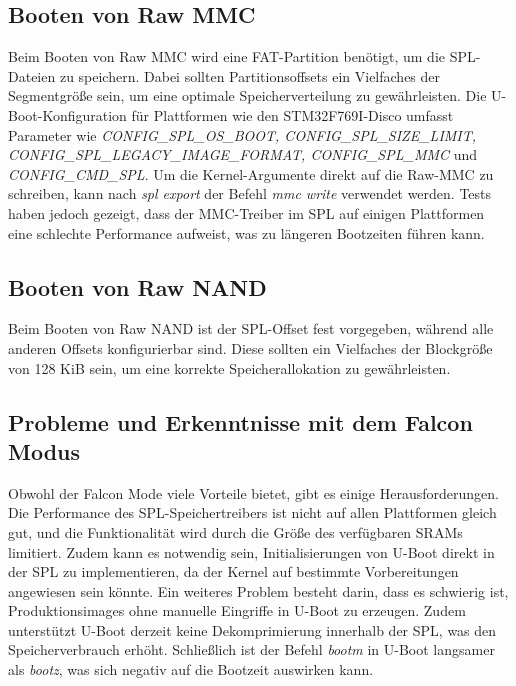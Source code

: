 \subsection{Booten von Raw MMC}
Beim Booten von Raw MMC wird eine FAT-Partition benötigt, um die SPL-Dateien zu speichern. Dabei sollten
Partitionsoffsets ein Vielfaches der Segmentgröße sein, um eine optimale Speicherverteilung zu gewährleisten.
Die U-Boot-Konfiguration für Plattformen wie den STM32F769I-Disco umfasst Parameter wie
\textit{CONFIG\_SPL\_OS\_BOOT, CONFIG\_SPL\_SIZE\_LIMIT, CONFIG\_SPL\_LEGACY\_IMAGE\_FORMAT, CONFIG\_SPL\_MMC}
und \textit{CONFIG\_CMD\_SPL}. Um die Kernel-Argumente direkt auf die Raw-MMC zu schreiben, kann nach
\textit{spl export} der Befehl \textit{mmc write} verwendet werden. Tests haben jedoch gezeigt, dass der
MMC-Treiber im SPL auf einigen Plattformen eine schlechte Performance aufweist, was zu längeren Bootzeiten
führen kann.

\subsection{Booten von Raw NAND}
Beim Booten von Raw NAND ist der SPL-Offset fest vorgegeben, während alle anderen Offsets konfigurierbar sind.
Diese sollten ein Vielfaches der Blockgröße von 128 KiB sein, um eine korrekte Speicherallokation zu
gewährleisten.

\subsection{Probleme und Erkenntnisse mit dem Falcon Modus}
Obwohl der Falcon Mode viele Vorteile bietet, gibt es einige Herausforderungen. Die Performance des
SPL-Speichertreibers ist nicht auf allen Plattformen gleich gut, und die Funktionalität wird durch die Größe
des verfügbaren SRAMs limitiert. Zudem kann es notwendig sein, Initialisierungen von U-Boot direkt in der SPL
zu implementieren, da der Kernel auf bestimmte Vorbereitungen angewiesen sein könnte. Ein weiteres Problem
besteht darin, dass es schwierig ist, Produktionsimages ohne manuelle Eingriffe in U-Boot zu erzeugen. Zudem
unterstützt U-Boot derzeit keine Dekomprimierung innerhalb der SPL, was den Speicherverbrauch erhöht.
Schließlich ist der Befehl \textit{bootm} in U-Boot langsamer als \textit{bootz}, was sich negativ auf die
Bootzeit auswirken kann.

